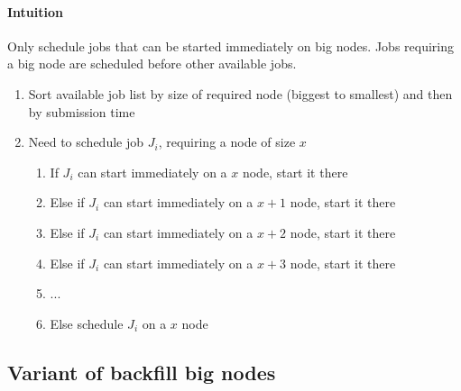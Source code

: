 \documentclass[a4paper]{article}
\begin{document}
\paragraph{Intuition} Only schedule jobs that can be started immediately on big nodes.
Jobs requiring a big node are scheduled before other available jobs.
\begin{enumerate}
	\item Sort available job list by size of required node (biggest to smallest) and then by submission time
	\item Need to schedule job $J_i$, requiring a node of size $x$
	\begin{enumerate}
		\item If $J_i$ can start immediately on a $x$ node, start it there
		\item Else if $J_i$ can start immediately on a $x+1$ node, start it there
		\item Else if $J_i$ can start immediately on a $x+2$ node, start it there
		\item Else if $J_i$ can start immediately on a $x+3$ node, start it there
		\item ...
		\item Else schedule $J_i$ on a $x$ node
	\end{enumerate}
\end{enumerate}

\subsection{Variant of backfill big nodes}
\end{document}
